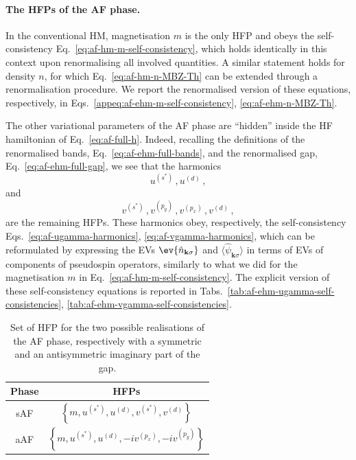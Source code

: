 \paragraph{The HFPs of the AF phase.}

In the conventional HM, magnetisation $m$ is the only HFP and obeys the self-consistency Eq.~\eqref{eq:af-hm-m-self-consistency}, which holds identically in this context upon renormalising all involved quantities. A similar statement holds for density $n$, for which Eq.~\eqref{eq:af-hm-n-MBZ-Th} can be extended through a renormalisation procedure. We report the renormalised version of these equations, respectively, in Eqs.~\eqref{appeq:af-ehm-m-self-consistency}, \eqref{eq:af-ehm-n-MBZ-Th}.

The other variational parameters of the AF phase are ``hidden'' inside the HF hamiltonian of Eq.~\eqref{eq:af-full-h}. Indeed, recalling the definitions of the renormalised bands, Eq.~\eqref{eq:af-ehm-full-bands}, and the renormalised gap, Eq.~\eqref{eq:af-ehm-full-gap}, we see that the harmonics 
\[
	u^{(s^*)} \, ,
	u^{(d)} \, ,
\] 
and
\[
	v^{(s^*)} \, ,
	v^{(p_y)} \, ,
	v^{(p_x)} \, ,
	v^{(d)} \, ,
\]
are the remaining HFPs. These harmonics obey, respectively, the self-consistency Eqs.~\eqref{eq:af-ugamma-harmonics}, \eqref{eq:af-vgamma-harmonics}, which can be reformulated by expressing the EVs $\ev{\hat n_{\mathbf{k}\sigma}}$ and $\langle \hat \psi_{\mathbf{k}\sigma} \rangle$ in terms of EVs of components of pseudospin operators, similarly to what we did for the magnetisation $m$ in Eq.~\eqref{eq:af-hm-m-self-consistency}. The explicit version of these self-consistency equations is reported in Tabs.~\ref{tab:af-ehm-ugamma-self-consistencies}, \ref{tab:af-ehm-vgamma-self-consistencies}.

\begin{table}
	\centering
	\begin{tabular}{c c}
		\textbf{Phase} & \textbf{HFPs} \\
		\midrule
		sAF & $\left\lbrace 
		m, u^{(s^*)}, u^{(d)}, v^{(s^*)}, v^{(d)}
		\right\rbrace$ \\[0.7em]
		aAF & $\left\lbrace
		m, u^{(s^*)}, u^{(d)}, -iv^{(p_x)}, -iv^{(p_y)}
		\right\rbrace$ \\
		\midrule
	\end{tabular}
	\caption{Set of HFP for the two possible realisations of the AF phase, respectively with a symmetric and an antisymmetric imaginary part of the gap.}
	\label{tab:af-saf-aaf-hfps}
\end{table}

